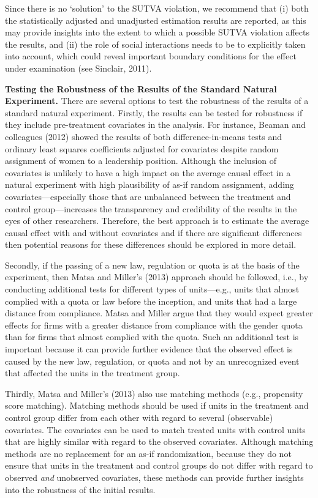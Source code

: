 \documentclass[english]{article}
\begin{document}
Since there is no `solution' to the SUTVA violation, we recommend that
(i) both the statistically adjusted and unadjusted estimation results
are reported, as this may provide insights into the extent to which a
possible SUTVA violation affects the results, and (ii) the role of
social interactions needs to be to explicitly taken into account, which
could reveal important boundary conditions for the effect under
examination (see Sinclair, 2011).

\noindent \textbf{Testing the Robustness of the Results of the Standard Natural
Experiment.} There are several options to test the robustness of the results of a
standard natural experiment. Firstly, the results can be tested for
robustness if they include pre-treatment covariates in the analysis. For
instance, Beaman and colleagues (2012) showed the results of both
difference-in-means tests and ordinary least squares coefficients
adjusted for covariates despite random assignment of women to a
leadership position. Although the inclusion of covariates is unlikely to
have a high impact on the average causal effect in a natural experiment
with high plausibility of as-if random assignment, adding
covariates---especially those that are unbalanced between the treatment
and control group---increases the transparency and credibility of the
results in the eyes of other researchers. Therefore, the best approach
is to estimate the average causal effect with and without covariates and
if there are significant differences then potential reasons for these
differences should be explored in more detail.

Secondly, if the passing of a new law, regulation or quota is at the
basis of the experiment, then Matsa and Miller's (2013) approach should
be followed, i.e., by conducting additional tests for different types of
units---e.g., units that almost complied with a quota or law before the
inception, and units that had a large distance from compliance. Matsa
and Miller argue that they would expect greater effects for firms with a
greater distance from compliance with the gender quota than for firms
that almost complied with the quota. Such an additional test is
important because it can provide further evidence that the observed
effect is caused by the new law, regulation, or quota and not by an
unrecognized event that affected the units in the treatment group.

Thirdly, Matsa and Miller's (2013) also use matching
methods (e.g., propensity score matching). Matching methods should be
used if units in the treatment and control group differ from each other
with regard to several (observable) covariates. The covariates can be
used to match treated units with control units that are highly similar
with regard to the observed covariates. Although matching methods are no
replacement for an as-if randomization, because they do not ensure that
units in the treatment and control groups do not differ with regard to
observed \emph{and} unobserved covariates, these methods can provide
further insights into the robustness of the initial results.
\end{document}
